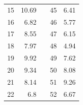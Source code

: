 \begin{table}[H]
\begin{tabular}{|r|r|l|r|r|}
  15                                                        & 10.69                                                     &  & 45                                                                              & 6.41                                                                             \\ \cline{1-2} \cline{4-5} 
  16                                                        & 6.82                                                      &  & 46                                                                              & 5.77                                                                             \\ \cline{1-2} \cline{4-5} 
  17                                                        & 8.55                                                      &  & 47                                                                              & 6.15                                                                             \\ \cline{1-2} \cline{4-5} 
  18                                                        & 7.97                                                      &  & 48                                                                              & 4.94                                                                             \\ \cline{1-2} \cline{4-5} 
  19                                                        & 9.92                                                      &  & 49                                                                              & 7.62                                                                             \\ \cline{1-2} \cline{4-5} 
  20                                                        & 9.34                                                      &  & 50                                                                              & 8.08                                                                             \\ \cline{1-2} \cline{4-5} 
  21                                                        & 8.14                                                      &  & 51                                                                              & 9.26                                                                             \\ \cline{1-2} \cline{4-5} 
  22                                                        & 6.8                                                       &  & 52                                                                              & 6.67                                                                             \\ \cline{1-2} \cline{4-5} 

\end{tabular}
\end{table}
